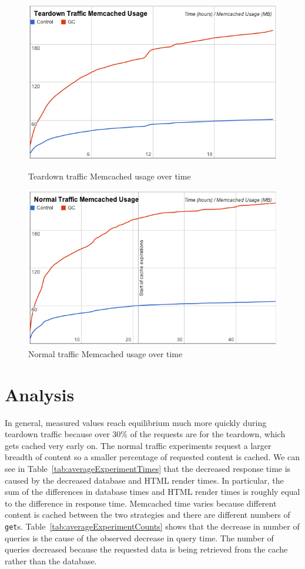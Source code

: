 \documentclass[12pt]{ucthesis}
\begin{document}
\begin{figure}[htp]
\centering
\includegraphics[width=\textwidth]{assets/teardownMemcachedUsageXTime.png}
\caption{Teardown traffic Memcached usage over time}
\label{fig:teardownMemcachedUsageXTime}

\vspace{2em}
\centering
\includegraphics[width=\textwidth]{assets/normalMemcachedUsageXTime.png}
\caption{Normal traffic Memcached usage over time}
\label{fig:normalMemcachedUsageXTime}
\end{figure}

\section{Analysis} \label{resultsAnalysis}
In general, measured values reach equilibrium much more quickly during teardown traffic because over 30\% of the requests are for the teardown, which gets cached very early on.
The normal traffic experiments request a larger breadth of content so a smaller percentage of requested content is cached.
We can see in Table~\ref{tab:averageExperimentTimes} that the decreased response time is caused by the decreased database and HTML render times.
In particular, the sum of the differences in database times and HTML render times is roughly equal to the difference in response time.
\textsf{Memcached} time varies because different content is cached between the two strategies and there are different numbers of {\tt get}s.
Table~\ref{tab:averageExperimentCounts} shows that the decrease in number of queries is the cause of the observed decrease in query time.
The number of queries decreased because the requested data is being retrieved from the cache rather than the database.
\end{document}
